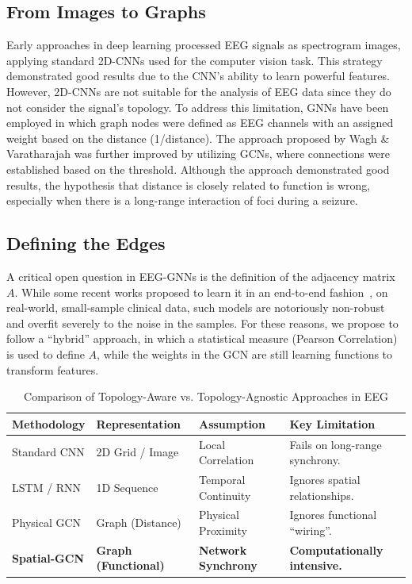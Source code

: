 \documentclass[journal]{IEEEtran}
\begin{document}
\subsection{From Images to Graphs}
Early approaches in deep learning processed EEG signals as spectrogram images, applying standard 2D-CNNs used for the computer vision task. This strategy demonstrated good results due to the CNN's ability to learn powerful features. However, 2D-CNNs are not suitable for the analysis of EEG data since they do not consider the signal's topology. To address this limitation, GNNs have been employed in which graph nodes were defined as EEG channels with an assigned weight based on the distance (1/distance). The approach proposed by Wagh \& Varatharajah \cite{wagh} was further improved by utilizing GCNs, where connections were established based on the threshold. Although the approach demonstrated good results, the hypothesis that distance is closely related to function is wrong, especially when there is a long-range interaction of foci during a seizure.

\subsection{Defining the Edges}
A critical open question in EEG-GNNs is the definition of the adjacency matrix $A$. While some recent works proposed to learn it in an end-to-end fashion~\cite{song, jang}, on real-world, small-sample clinical data, such models are notoriously non-robust and overfit severely to the noise in the samples. For these reasons, we propose to follow a ``hybrid'' approach, in which a statistical measure (Pearson Correlation) is used to define $A$, while the weights in the GCN are still learning functions to transform features.

\begin{table}[!t]
\caption{Comparison of Topology-Aware vs. Topology-Agnostic Approaches in EEG}
\label{tab:lit_comparison}
\centering
\small
\begin{tabular}{llll}
\toprule
\textbf{Methodology} & \textbf{Representation} & \textbf{Assumption} & \textbf{Key Limitation} \\ \midrule
Standard CNN & 2D Grid / Image & Local Correlation & Fails on long-range synchrony. \\
LSTM / RNN & 1D Sequence & Temporal Continuity & Ignores spatial relationships. \\
Physical GCN & Graph (Distance) & Physical Proximity & Ignores functional ``wiring''. \\
\textbf{Spatial-GCN} & \textbf{Graph (Functional)} & \textbf{Network Synchrony} & \textbf{Computationally intensive.} \\ \bottomrule
\end{tabular}
\end{table}
\end{document}
